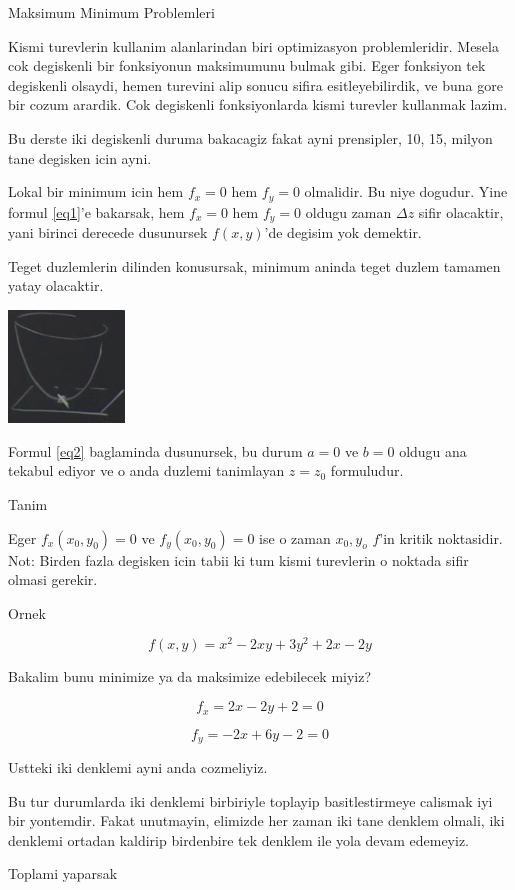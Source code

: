 \documentclass[12pt,fleqn]{article}
\begin{document}
Maksimum Minimum Problemleri 

Kismi turevlerin kullanim alanlarindan biri optimizasyon
problemleridir. Mesela cok degiskenli bir fonksiyonun maksimumunu bulmak
gibi. Eger fonksiyon tek degiskenli olsaydi, hemen turevini alip sonucu
sifira esitleyebilirdik, ve buna gore bir cozum arardik. Cok degiskenli
fonksiyonlarda kismi turevler kullanmak lazim. 

Bu derste iki degiskenli duruma bakacagiz fakat ayni prensipler, 10, 15,
milyon tane degisken icin ayni. 

Lokal bir minimum icin hem $f_x=0$ hem $f_y=0$ olmalidir. Bu niye
dogudur. Yine formul \ref{eq1}'e bakarsak, hem $f_x=0$ hem $f_y=0$ oldugu
zaman $\Delta z$ sifir olacaktir, yani birinci derecede dusunursek
$f(x,y)$'de degisim yok demektir. 

Teget duzlemlerin dilinden konusursak, minimum aninda teget duzlem tamamen
yatay olacaktir. 

\includegraphics[height=3cm]{9_3.png}

Formul \ref{eq2} baglaminda dusunursek, bu durum $a=0$ ve $b=0$ oldugu ana
tekabul ediyor ve o anda duzlemi tanimlayan $z = z_0$ formuludur. 

Tanim

Eger $f_x(x_0,y_0)= 0$ ve $f_y(x_0,y_0)= 0$ ise o zaman $x_0,y_o$ $f$'in
kritik noktasidir. Not: Birden fazla degisken icin tabii ki tum kismi
turevlerin o noktada sifir olmasi gerekir.

Ornek

\[ f(x,y) = x^2 - 2xy + 3y^2 + 2x - 2y \]

Bakalim bunu minimize ya da maksimize edebilecek miyiz? 

\[ f_x = 2x - 2y + 2 = 0\]

\[ f_y = -2x + 6y - 2 = 0 \]

Ustteki iki denklemi ayni anda cozmeliyiz. 

Bu tur durumlarda iki denklemi birbiriyle toplayip basitlestirmeye calismak
iyi bir yontemdir. Fakat unutmayin, elimizde her zaman iki tane denklem
olmali, iki denklemi ortadan kaldirip birdenbire tek denklem ile yola devam
edemeyiz. 

Toplami yaparsak
\end{document}
